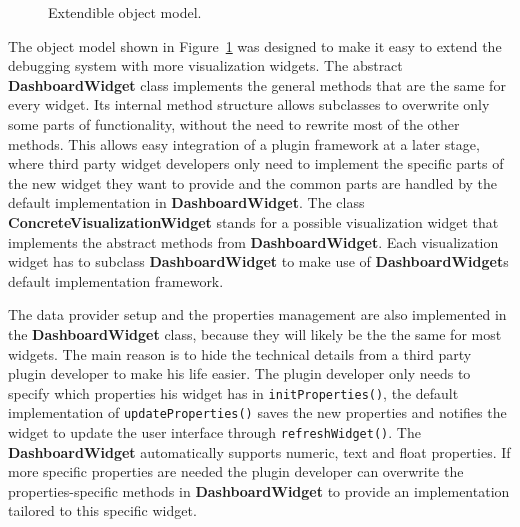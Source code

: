 \begin{figure}%
  \centering
  \caption{Extendible object model.}
  \label{class overview}
\end{figure}

The object model shown in Figure~\ref{class overview} was designed to make it easy to extend the debugging system with more visualization widgets. The abstract \textbf{DashboardWidget} class implements the general methods that are the same for every widget. Its internal method structure allows subclasses to overwrite only some parts of functionality, without the need to rewrite most of the other methods. This allows easy integration of a plugin framework at a later stage, where third party widget developers only need to implement the specific parts of the new widget they want to provide and the common parts are handled by the default implementation in \textbf{DashboardWidget}. The class \textbf{ConcreteVisualizationWidget} stands for a possible visualization widget that implements the abstract methods from \textbf{DashboardWidget}. Each visualization widget has to subclass \textbf{DashboardWidget} to make use of \textbf{DashboardWidget}s default implementation framework.

The data provider setup and the properties management are also implemented in the \textbf{DashboardWidget} class, because they will likely be the the same for most widgets. The main reason is to hide the technical details from a third party plugin developer to make his life easier. The plugin developer only needs to specify which properties his widget has in \verb+initProperties()+, the default implementation of \verb+updateProperties()+ saves the new properties and notifies the widget to update the user interface through \verb+refreshWidget()+.
\q The \textbf{DashboardWidget} automatically supports numeric, text and float properties. If more specific properties are needed the plugin developer can overwrite the properties-specific methods in \textbf{DashboardWidget} to provide an implementation tailored to this specific widget.

